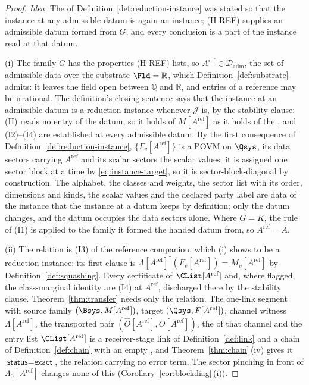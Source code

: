 \begin{proof}
\emph{Idea.} The  of Definition~\ref{def:reduction-instance}
was stated so that the instance at any admissible datum is again an
instance; (H-REF) supplies an admissible datum formed from $G$, and every
conclusion is a part of the instance read at that datum.

(i) The family $G$ has the properties (H-REF) lists, so
$A^{\mathrm{ref}}\in\mathcal{D}_{\mathrm{adm}}$, the set of admissible data
over the substrate $\Fld=\mathbb{R}$, which Definition~\ref{def:substrate}
admits: it leaves the field open between $\mathbb{Q}$ and $\mathbb{R}$, and
entries of a reference may be irrational. The definition's closing sentence
says that the instance at an admissible datum is a reduction instance
whenever $\mathcal{J}$ is, by the stability clause: (H) reads no entry of
the datum, so it holds of $M[A^{\mathrm{ref}}]$ as it holds of the , and (I2)--(I4) are established at every admissible datum. By the
first consequence of Definition~\ref{def:reduction-instance},
$\{F_v[A^{\mathrm{ref}}]\}$ is a POVM on $\Qsys$, its data sectors carrying
$A^{\mathrm{ref}}$ and its scalar sectors the scalar values; it is assigned
one sector block at a time by \eqref{eq:instance-target}, so it is
sector-block-diagonal by construction. The alphabet, the classes and
weights, the sector list with its order, dimensions and kinds, the scalar
values and the declared party label are data of the instance that the
instance at a datum keeps by definition; only the datum changes, and the
datum occupies the data sectors alone. Where $G=K$, the rule of (I1) is
applied to the family it formed the handed datum from, so
$A^{\mathrm{ref}}=A$.

(ii) The relation is (I3) of the reference companion, which (i) shows to be
a reduction instance; its first clause is
$\Lambda[A^{\mathrm{ref}}]^{\dagger}(F_v[A^{\mathrm{ref}}])
=M_v[A^{\mathrm{ref}}]$ by Definition~\ref{def:squashing}. Every
certificate of $\CList[A^{\mathrm{ref}}]$ and, where flagged, the
class-marginal identity are (I4) at $A^{\mathrm{ref}}$, discharged there by
the stability clause. Theorem~\ref{thm:transfer} needs only the relation.
The one-link segment with source family $(\Bsys,M[A^{\mathrm{ref}}])$,
target $(\Qsys,F[A^{\mathrm{ref}}])$, channel witness
$\Lambda[A^{\mathrm{ref}}]$, the transported pair
$(\hat O[A^{\mathrm{ref}}],O[A^{\mathrm{ref}}])$, the 
of that channel and the entry list $\CList[A^{\mathrm{ref}}]$ is a
receiver-stage link of Definition~\ref{def:link} and a chain of
Definition~\ref{def:chain} with an empty , and
Theorem~\ref{thm:chain}\,(iv) gives it $\textsf{status}=\textsf{exact}$,
the relation carrying no error term. The sector pinching in front of
$\Lambda_0[A^{\mathrm{ref}}]$ changes none of this
(Corollary~\ref{cor:blockdiag}\,(i)).


\end{proof}
